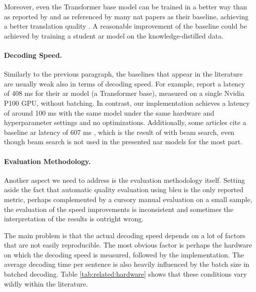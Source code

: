 Moreover, even the Transformer base model can be trained in a better way than
as reported by \citet{vaswani2017attention} and as referenced by many \ac{nat}
papers as their baseline, achieving a better translation quality
\citep{popel-bojar-2018-training}. A reasonable improvement of the baseline
could be achieved by training a student \ac{ar} model on the
knowledge-distilled data.

\paragraph{Decoding Speed.} Similarly to the previous paragraph, the baselines
that appear in the literature are usually weak also in terms of decoding speed.
For example, \citet{gu2017nonautoregressive} report a latency of 408 ms for
their \ac{ar} model (a Transformer base), measured on a single Nvidia P100 GPU,
without batching. In contrast, our implementation achieves a latency of around
100 ms with the same model under the same hardware and hyperparameter settings
and no optimizations. Additionally, some articles cite a baseline \ac{ar}
latency of 607 ms \citep{wang-etal-2019-nonautoregressive,
  guo-etal-2020-jointly}, which is the result of
\citet{gu2017nonautoregressive} with beam search, even though beam search is
not used in the presented \ac{nar} models for the most part.

\paragraph{Evaluation Methodology.} Another aspect we need to address is the
evaluation methodology itself. Setting aside the fact that automatic quality
evaluation using \acs{bleu} is the only reported metric, perhaps complemented
by a cursory manual evaluation on a small sample, the evaluation of the speed
improvements is inconsistent and sometimes the interpretation of the results is
outright wrong.

The main problem is that the actual decoding speed depends on a lot of factors
that are not easily reproducible. The most obvious factor is perhaps the
hardware on which the decoding speed is measured, followed by the
implementation. The average decoding time per sentence is also heavily
influenced by the batch size in batched decoding. Table
\ref{tab:related:hardware} shows that these conditions vary wildly within the
literature.

